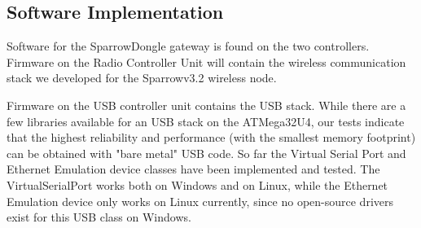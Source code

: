 \subsection{Software Implementation}

Software for the SparrowDongle gateway is found on the two controllers.
Firmware on the Radio Controller Unit will contain the wireless communication stack we developed for the Sparrowv3.2 wireless node.

Firmware on the USB controller unit contains the USB stack. While there are a
few libraries available for an USB stack on the ATMega32U4, our tests indicate
that the highest reliability and performance (with the smallest memory
footprint) can be obtained with "bare metal" USB code. So far the Virtual
Serial Port and Ethernet Emulation device classes have been implemented and
tested. The VirtualSerialPort works both on Windows and on Linux, while the
Ethernet Emulation device only works on Linux currently, since no open-source
drivers exist for this USB class on Windows. 


